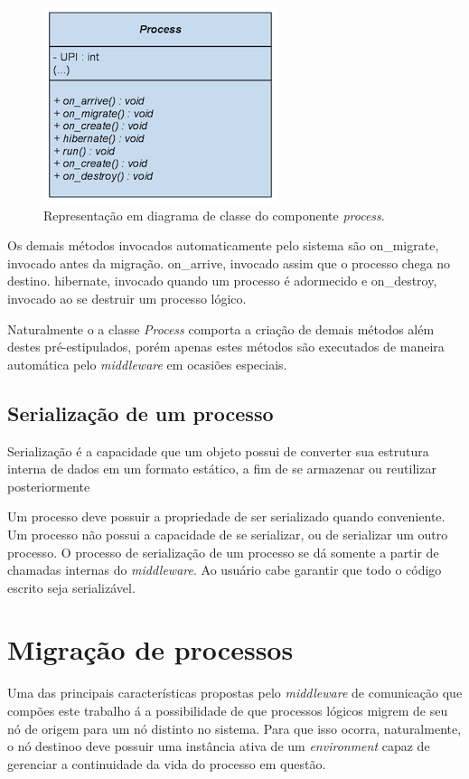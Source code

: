 \begin{figure}
  \centerline{\includegraphics{process_uml.png}}
  \caption{Representação em diagrama de classe do componente \textit{process}.}
\label{fig:process_uml}
\end{figure}

Os demais métodos invocados automaticamente pelo sistema são on\_migrate, invocado antes da migração. on\_arrive, invocado assim que o processo chega no destino. hibernate, invocado quando um processo é adormecido e on\_destroy, invocado ao se destruir um processo lógico.

Naturalmente o a classe \textit{Process} comporta a criação de demais métodos além destes pré-estipulados, porém apenas estes métodos são executados de maneira automática pelo \textit{middleware} em ocasiões especiais.

\subsection{Serialização de um processo}

Serialização é a capacidade que um objeto possui de converter sua estrutura interna de dados em um formato estático, a fim de se armazenar ou reutilizar posteriormente

Um processo deve possuir a propriedade de ser serializado quando conveniente. Um processo não possui a capacidade de se serializar, ou de serializar um outro processo. O processo de serialização de um processo se dá somente a partir de chamadas internas do \textit{middleware}. Ao usuário cabe garantir que todo o código escrito seja serializável.

\section{Migração de processos \label{migracao}}

Uma das principais características propostas pelo \textit{middleware} de comunicação que compões este trabalho á a possibilidade de que processos lógicos migrem de seu nó de origem para um nó distinto no sistema. Para que isso ocorra, naturalmente, o nó destinoo deve possuir uma instância ativa de um \textit{environment} capaz de gerenciar a continuidade da vida do processo em questão.


